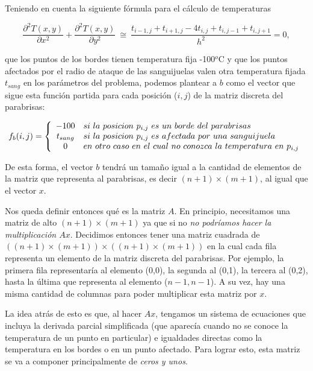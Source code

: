\vspace{\baselineskip}

 Teniendo en cuenta la siguiente fórmula para el cálculo de temperaturas

\[
\frac{\partial^2T(x,y)}{\partial x^{2}}+\frac{\partial^2 T(x,y)}{\partial y^{2}} \ \cong \ \frac{ t_{i-1,j} + t_{i+1,j} - 4t_{i,j} + t_{i,j-1} + t_{i,j+1}}{h^2} = 0,
\]

que los puntos de los bordes tienen temperatura fija -100${}^o$C y que los puntos afectados por el radio de ataque de las sanguijuelas valen otra temperatura fijada $t_{sang}$ en los parámetros del problema, podemos plantear a $b$ como el vector que sigue esta función partida para cada posición ($i,j$) de la matriz discreta del parabrisas:

$$f_{b}(i,j) = \left\{
\begin{array}{c l}
 -100 & si \ la \ posicion  \ p_{i,j} \ es  \ un \ borde  \ del \ parabrisas\\
 t_{sang} & si \ la \ posicion  \ p_{i,j} \ es \ afectada \ por \ una \ sanguijuela \\
 0 & en \ otro \ caso \ en \ el \ cual \ no \ conozca \ la \ temperatura \ en \ p_{i,j}
\end{array}
\right.
$$

De esta forma, el vector $b$ tendrá un tamaño igual a la cantidad de elementos de la matriz que representa al parabrisas, es decir $(n+1) \times (m+1)$, al igual que el vector $x$.

\vspace{\baselineskip}

Nos queda definir entonces qué es la matriz $A$. En principio, necesitamos una matriz de alto $(n+1) \times (m+1)$ ya que si no \textit{no podríamos hacer la multiplicación $Ax$}. Decidimos entonces tener una matriz cuadrada de  $((n+1) \times (m+1)) \times  ((n+1) \times (m+1))$ en la cual cada fila representa un elemento de la matriz discreta del parabrisas. Por ejemplo, la primera fila representaría al elemento (0,0), la segunda al (0,1), la tercera al (0,2), hasta la última que representa al elemento ($n-1,n-1$). A su vez, hay una misma cantidad de columnas para poder multiplicar esta matriz por $x$.

La idea atrás de esto es que, al hacer $Ax$, tengamos un sistema de ecuaciones que incluya la derivada parcial simplificada (que aparecía cuando no se conoce la temperatura de un punto en particular) e igualdades directas como la temperatura en los bordes o en un punto afectado. Para lograr esto, esta matriz se va a componer principalmente de \textit{ceros y unos}.

